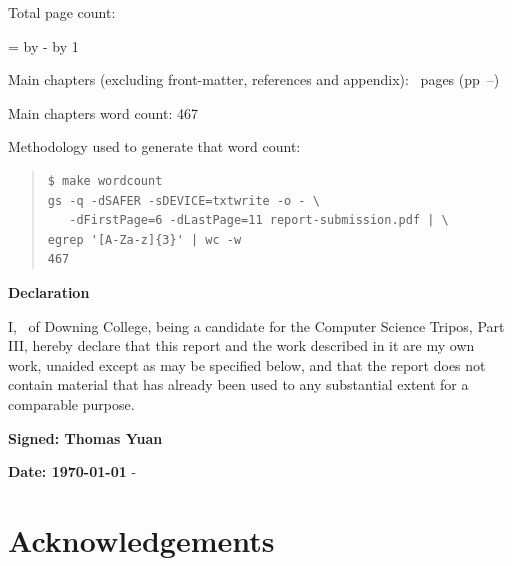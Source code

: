 \documentclass[12pt,a4paper,twoside]{report}
\newif\ifsubmission %
\newcommand{\college}{Downing College}
\newcommand{\course}{Computer Science Tripos, Part III}
\begin{document}
\begin{sffamily}
\newpage

Total page count: \pageref{lastpage}

\makeatletter
\@tempcnta=\relax%
\advance\@tempcnta by -%
\advance\@tempcnta by 1%
\xdef\contentpages{\the\@tempcnta}%
\makeatother

Main chapters (excluding front-matter, references and appendix):
\contentpages~pages
(pp~\pageref{firstcontentpage}--\pageref{lastcontentpage})

Main chapters word count: 467

Methodology used to generate that word count:

\begin{quote}
\begin{verbatim}
$ make wordcount
gs -q -dSAFER -sDEVICE=txtwrite -o - \
   -dFirstPage=6 -dLastPage=11 report-submission.pdf | \
egrep '[A-Za-z]{3}' | wc -w
467
\end{verbatim}
\end{quote}


\end{sffamily}

\vspace{\fill}
\onehalfspacing
\ifsubmission\else\makeatletter
\textbf{\Huge Declaration}
\vspace{40pt}

I, \@author\ of \college, being a candidate for the \course, hereby
declare that this report and the work described in it are my own work,
unaided except as may be specified below, and that the report does not
contain material that has already been used to any substantial extent
for a comparable purpose.


\bigskip 
\textbf{Signed: Thomas Yuan}

\bigskip
\textbf{Date: \today}
\vspace{\fill}
\makeatother\fi-



\ifsubmission\else

\chapter*{Acknowledgements}
\end{document}

